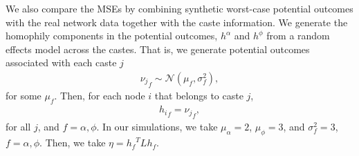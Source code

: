 \documentclass[12pt]{article}
\theoremstyle{definition}
\numberwithin{equation}{section}
\numberwithin{figure}{section}
\newcommand{\calN}{{\mathcal N}}
\numberwithin{equation}{section}
\numberwithin{figure}{section}
\begin{document}


We also compare the MSEs by combining synthetic worst-case potential outcomes with the real network data together with the caste information. We generate the homophily components in the potential outcomes, $h^\alpha$ and $h^\phi$ from a random effects model across the castes. That is, we generate potential outcomes associated with each caste $j$
\begin{align*}
    {\nu_j}_f \sim \calN(\mu_f, \sigma^2_f), 
\end{align*} for some $\mu_f$.
Then, for each node $i$ that belongs to caste $j$,
\begin{align*}
   {h_i}_f = {\nu_j}_f ,
\end{align*} for all $j$, and $f = \alpha, \phi$. In our simulations, we take $\mu_\alpha = 2$, $\mu_\phi = 3$, and $\sigma_f^2 = 3$, $f= \alpha, \phi$. Then, we take $\eta= {h_f}^T L h_f$. 
\end{document}
